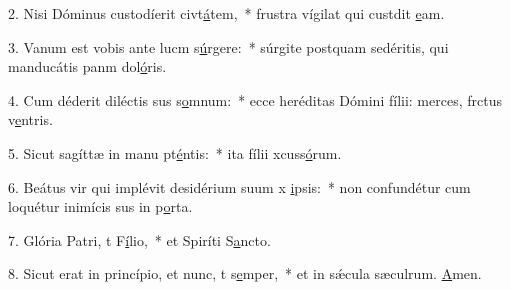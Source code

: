 2. Nisi Dóminus custodíerit civt\uline{á}tem,~* frustra vígilat qui custdit \uline{e}am.\par 
3. Vanum est vobis ante lucm s\uline{ú}rgere:~* súrgite postquam sedéritis, qui manducátis panm dol\uline{ó}ris.\par 
4. Cum déderit diléctis sus s\uline{o}mnum:~* ecce heréditas Dómini fílii: merces, frctus v\uline{e}ntris.\par 
5. Sicut sagíttæ in manu pt\uline{é}ntis:~* ita fílii xcuss\uline{ó}rum.\par 
6. Beátus vir qui implévit desidérium suum x \uline{i}psis:~* non confundétur cum loquétur inimícis sus in p\uline{o}rta.\par 
7. Glória Patri, t F\uline{í}lio,~* et Spiríti S\uline{a}ncto.\par 
8. Sicut erat in princípio, et nunc, t s\uline{e}mper,~* et in sǽcula sæculrum. \uline{A}men.\par 
